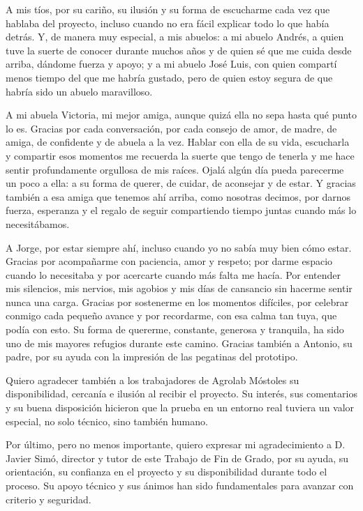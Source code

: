 A mis tíos, por su cariño, su ilusión y su forma de escucharme cada vez que hablaba del proyecto, incluso cuando no era fácil explicar todo lo que había detrás. Y, de manera muy especial, a mis abuelos: a mi abuelo Andrés, a quien tuve la suerte de conocer durante muchos años y de quien sé que me cuida desde arriba, dándome fuerza y apoyo; y a mi abuelo José Luis, con quien compartí menos tiempo del que me habría gustado, pero de quien estoy segura de que habría sido un abuelo maravilloso.

A mi abuela Victoria, mi mejor amiga, aunque quizá ella no sepa hasta qué punto lo es. Gracias por cada conversación, por cada consejo de amor, de madre, de amiga, de confidente y de abuela a la vez. Hablar con ella de su vida, escucharla y compartir esos momentos me recuerda la suerte que tengo de tenerla y me hace sentir profundamente orgullosa de mis raíces. Ojalá algún día pueda parecerme un poco a ella: a su forma de querer, de cuidar, de aconsejar y de estar. Y gracias también a esa amiga que tenemos ahí arriba, como nosotras decimos, por darnos fuerza, esperanza y el regalo de seguir compartiendo tiempo juntas cuando más lo necesitábamos.

A Jorge, por estar siempre ahí, incluso cuando yo no sabía muy bien cómo estar. Gracias por acompañarme con paciencia, amor y respeto; por darme espacio cuando lo necesitaba y por acercarte cuando más falta me hacía. Por entender mis silencios, mis nervios, mis agobios y mis días de cansancio sin hacerme sentir nunca una carga. Gracias por sostenerme en los momentos difíciles, por celebrar conmigo cada pequeño avance y por recordarme, con esa calma tan tuya, que podía con esto. Su forma de quererme, constante, generosa y tranquila, ha sido uno de mis mayores refugios durante este camino. Gracias también a Antonio, su padre, por su ayuda con la impresión de las pegatinas del prototipo.

Quiero agradecer también a los trabajadores de Agrolab Móstoles su disponibilidad, cercanía e ilusión al recibir el proyecto. Su interés, sus comentarios y su buena disposición hicieron que la prueba en un entorno real tuviera un valor especial, no solo técnico, sino también humano.

Por último, pero no menos importante, quiero expresar mi agradecimiento a D. Javier Simó, director y tutor de este Trabajo de Fin de Grado, por su ayuda, su orientación, su confianza en el proyecto y su disponibilidad durante todo el proceso. Su apoyo técnico y sus ánimos han sido fundamentales para avanzar con criterio y seguridad.

